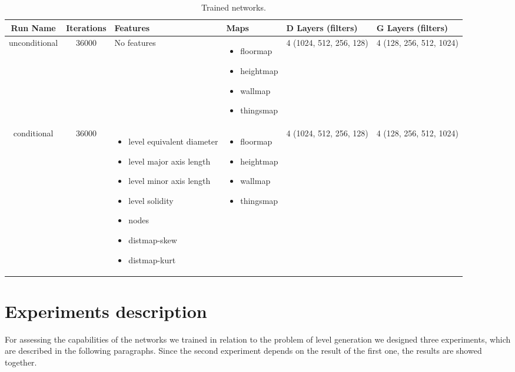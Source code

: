 \begin{table}[h!]
	\begin{tabularx}{\textwidth}{| c | c | X | X | X | X |}
		\hline
		\textbf{Run Name} & \textbf{Iterations} & \textbf{Features} & \textbf{Maps} & \textbf{D Layers (filters)} & \textbf{G Layers (filters)} \\
		\hline
		
		
		
		unconditional & 36000 & 
		No features
		& 
		\begin{itemize}
			\raggedright
			\small
			\item[] floormap
			\item[] heightmap
			\item[] wallmap
			\item[] thingsmap
		\end{itemize}
		& 4 (1024, 512, 256, 128) & 4 (128, 256, 512, 1024)\\
		
		\hline
	
		conditional & 36000 & 
		\begin{itemize}
			\raggedright
			\small
			\item[] level equivalent diameter
			\item[] level major axis length
			\item[] level minor axis length
			\item[] level solidity
			\item[] nodes
			\item[] distmap-skew
			\item[] distmap-kurt
		\end{itemize}
		& 
		\begin{itemize}
			\raggedright
			\small
			\item[] floormap
			\item[] heightmap
			\item[] wallmap
			\item[] thingsmap
		\end{itemize}
		& 4 (1024, 512, 256, 128) & 4 (128, 256, 512, 1024)\\
		
		\hline
		
	\end{tabularx}
	\caption[ Trained Models ]{ Trained networks. }
	\label{tab:trained_models}
\end{table}	

\section{Experiments description}
\label{sec:experiments}
For assessing the capabilities of the networks we trained in relation to the problem of level generation we designed three experiments, which are described in the following paragraphs. Since the second experiment depends on the result of the first one, the results are showed together.

